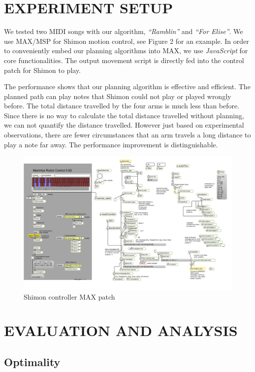 \documentclass[letterpaper, 10 pt, conference]{ieeeconf}  %
\begin{document}
\section{EXPERIMENT SETUP}

We tested two MIDI songs with our algorithm, \textit{``Ramblin''} and \textit{``For Elise''}. We use MAX/MSP for Shimon motion control, see Figure 2 for an example. In order to conveniently embed our planning algorithms into MAX, we use \textit{JavaScript} for core functionalities. The output movement script is directly fed into the control patch for Shimon to play. 

The performance shows that our planning algorithm is effective and efficient. The planned path can play notes that Shimon could not play or played wrongly before. The total distance travelled by the four arms is much less than before. Since there is no way to calculate the total distance travelled without planning, we can not quantify the distance travelled. However just based on experimental observations, there are fewer circumstances that an arm travels a long distance to play a note far away. The performance improvement is distinguishable.

\begin{figure}[h!]
\centering
\includegraphics[scale=0.2]{figure2.png}
\caption{Shimon controller MAX patch}
\label{Max patch}
\end{figure}

\section{EVALUATION AND ANALYSIS}

\subsection{Optimality}
\end{document}
